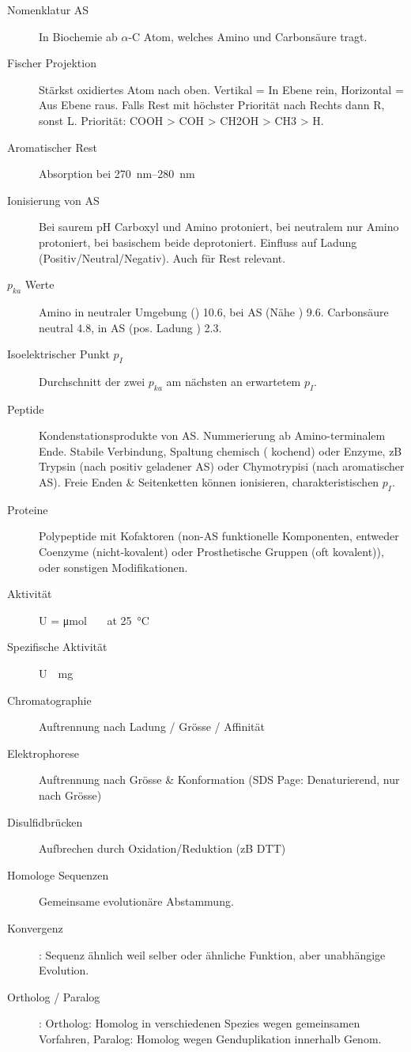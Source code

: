 \documentclass[a4paper,twocolumn,english,fontsize=7,DIV=16]{scrartcl}
\begin{document}
\begin{description}
	\item [Nomenklatur AS] In Biochemie ab $\alpha$-C Atom, welches Amino und Carbonsäure tragt.
	\item[Fischer Projektion] Stärkst oxidiertes Atom nach oben. Vertikal =
		In Ebene rein, Horizontal = Aus Ebene raus. Falls Rest mit
		höchster Priorität nach Rechts dann R, sonst L.  Priorität:
		COOH > COH > CH2OH > CH3 > H.
	\item[Aromatischer Rest] Absorption bei \SIrange{270}{280}{\nm}
	\item[Ionisierung von AS] Bei saurem pH Carboxyl und Amino protoniert,
		bei neutralem nur Amino protoniert, bei basischem beide
		deprotoniert. Einfluss auf Ladung (Positiv/Neutral/Negativ).
		Auch für Rest relevant.
	\item[$p_{ka}$ Werte] Amino in neutraler Umgebung () 10.6, bei
		AS (Nähe ) 9.6. Carbonsäure neutral 4.8, in AS (pos.
		Ladung ) 2.3.
	\item[Isoelektrischer Punkt $p_I$] Durchschnitt der zwei $p_{ka}$ am
		nächsten an erwartetem $p_I$.
	\item [Peptide] Kondenstationsprodukte von AS. Nummerierung ab
		Amino-terminalem Ende. Stabile Verbindung, Spaltung chemisch
		( kochend) oder Enzyme, zB Trypsin (nach positiv
		geladener AS) oder Chymotrypisi (nach aromatischer AS). Freie
		Enden \& Seitenketten können ionisieren, charakteristischen
		$p_I$.
	\item[Proteine] Polypeptide mit Kofaktoren (non-AS funktionelle
		Komponenten, entweder Coenzyme (nicht-kovalent) oder
		Prosthetische Gruppen (oft kovalent)), oder sonstigen
		Modifikationen.
	\item[Aktivität] \si{U} = \si{\micro \mole {} \per \min} at \SI{25}{\celsius}
	\item[Spezifische Aktivität] \si{U \per \mg {}}
	\item[Chromatographie] Auftrennung nach Ladung / Grösse / Affinität
	\item[Elektrophorese] Auftrennung nach Grösse \& Konformation (SDS
		Page: Denaturierend, nur nach Grösse)
	\item[Disulfidbrücken] Aufbrechen durch Oxidation/Reduktion (zB DTT)
	\item[Homologe Sequenzen] Gemeinsame evolutionäre Abstammung.
	\item[Konvergenz]: Sequenz ähnlich weil selber oder ähnliche Funktion, aber unabhängige Evolution.
	\item[Ortholog / Paralog]: Ortholog: Homolog in verschiedenen Spezies
		wegen gemeinsamen Vorfahren, Paralog: Homolog wegen
		Genduplikation innerhalb Genom.
\end{description}
\end{document}
